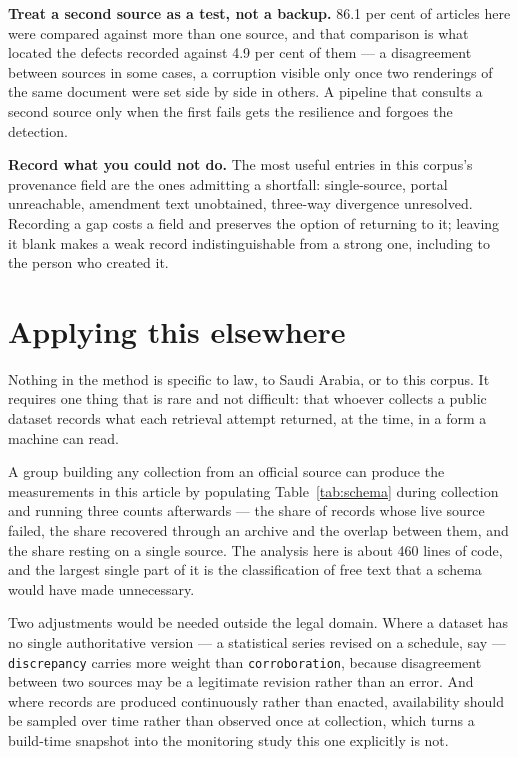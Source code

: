 \documentclass[11pt]{article}
\begin{document}
\textbf{Treat a second source as a test, not a backup.} 86.1 per cent of
articles here were compared against more than one source, and that comparison
is what located the defects recorded against 4.9 per cent of them --- a
disagreement between sources in some cases, a corruption visible only once two
renderings of the same document were set side by side in others. A pipeline
that consults a second source only when the first fails gets the resilience and
forgoes the detection.

\textbf{Record what you could not do.} The most useful entries in this corpus's
provenance field are the ones admitting a shortfall: single-source, portal
unreachable, amendment text unobtained, three-way divergence unresolved.
Recording a gap costs a field and preserves the option of returning to it;
leaving it blank makes a weak record indistinguishable from a strong one,
including to the person who created it.

\section{Applying this elsewhere}

Nothing in the method is specific to law, to Saudi Arabia, or to this corpus.
It requires one thing that is rare and not difficult: that whoever collects a
public dataset records what each retrieval attempt returned, at the time, in a
form a machine can read.

A group building any collection from an official source can produce the
measurements in this article by populating Table~\ref{tab:schema} during
collection and running three counts afterwards --- the share of records whose
live source failed, the share recovered through an archive and the overlap
between them, and the share resting on a single source. The analysis here is
about 460 lines of code, and the largest single part of it is the
classification of free text that a schema would have made unnecessary.

Two adjustments would be needed outside the legal domain. Where a dataset has
no single authoritative version --- a statistical series revised on a schedule,
say --- \texttt{discrepancy} carries more weight than \texttt{corroboration},
because disagreement between two sources may be a legitimate revision rather
than an error. And where records are produced continuously rather than
enacted, availability should be sampled over time rather than observed once at
collection, which turns a build-time snapshot into the monitoring study this
one explicitly is not.
\end{document}

